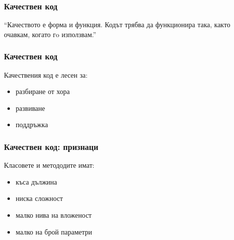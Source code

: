 \begin{frame}
  \frametitle{Качествен код}\pause

\begin{exampleblock}{}
  {\large ``Качеството е форма и функция. \pause Кодът трябва да функционира така, както очавкам, когато гo използвам.''}
\end{exampleblock}
\end{frame}

\begin{frame}
  \frametitle{Качествен код}
  Качествения код е лесен за:\pause
  \begin{itemize}
  \item разбиране от хора\pause
  \item развиване\pause
  \item поддръжка
  \end{itemize}
\end{frame}


\begin{frame}
  \frametitle{Качествен код: признаци}
  Класовете и метододите имат:\pause
  \begin{itemize}
  \item къса дължина\pause
  \item ниска сложност\pause
  \item малко нива на вложеност\pause
  \item малко на брой параметри
  \end{itemize}
\end{frame}
